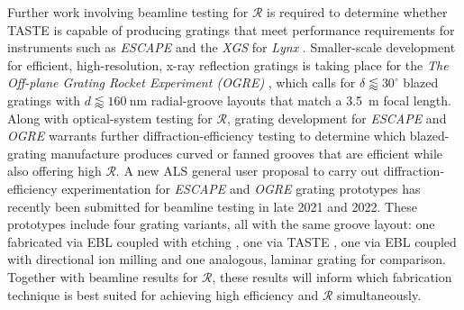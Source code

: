 Further work involving beamline testing for $\mathscr{R}$ is required to determine whether TASTE is capable of producing gratings that meet performance requirements for instruments such as \emph{ESCAPE} and the \emph{XGS} for \emph{Lynx} \cite{France19,McEntaffer19}. 
Smaller-scale development for efficient, high-resolution, x-ray reflection gratings is taking place for the \emph{The Off-plane Grating Rocket Experiment (OGRE)} \cite{DeRoo13,McEntaffer14,Donovan18b,Tutt18,Donovan19a,Donovan19b}, which calls for $\delta \lessapprox 30^{\circ}$ blazed gratings with $d \lessapprox \SI{160}{\nm}$ radial-groove layouts that match a \SI{3.5}{\metre} focal length. 
Along with optical-system testing for $\mathscr{R}$, grating development for \emph{ESCAPE} and \emph{OGRE} warrants further diffraction-efficiency testing to determine which blazed-grating manufacture produces curved or fanned grooves that are efficient while also offering high $\mathscr{R}$. 
A new ALS general user proposal to carry out diffraction-efficiency experimentation for \emph{ESCAPE} and \emph{OGRE} grating prototypes has recently been submitted for beamline testing in late 2021 and 2022. 
These prototypes include four grating variants, all with the same groove layout: one fabricated via EBL coupled with  etching \cite{Miles18}, one via TASTE \cite{McCoy20,McCurdy20}, one via EBL coupled with directional ion milling \cite{Miles2019_ion_mill} and one analogous, laminar grating for comparison. 
Together with beamline results for $\mathscr{R}$, these results will inform which fabrication technique is best suited for achieving high efficiency and $\mathscr{R}$ simultaneously. 



